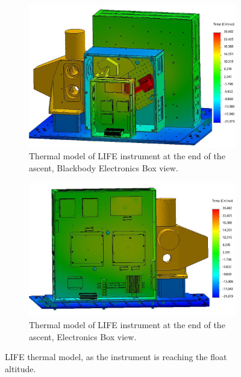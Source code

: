 \begin{figure}
    \centering
    \begin{subfigure}[h]{0.9\textwidth}
        \centering
        \includegraphics[width=\textwidth]{chap4_images/ascent_images/ascent_pt2/Test_30_BBEbox_FIXED.png}
        \caption{Thermal model of LIFE instrument at the end of the ascent, Blackbody Electronics Box view.}
        \label{fig:ascent_pt2_model_bbebox}
    \end{subfigure}
    \begin{subfigure}[h]{0.9\textwidth}
        \centering
        \includegraphics[width=\textwidth]{chap4_images/ascent_images/ascent_pt2/Test_30_Ebox_FIXED.png}
        \caption{Thermal model of LIFE instrument at the end of the ascent, Electronics Box view.}
        \label{fig:ascent_pt2_model_ebox}
    \end{subfigure}
    \caption{LIFE thermal model, as the instrument is reaching the float altitude.}
    \label{ascent_pt2_model}
\end{figure}

